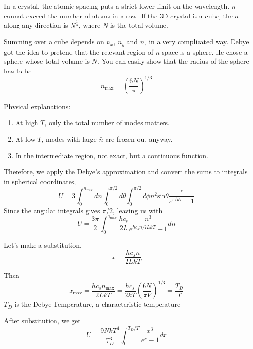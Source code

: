 In a crystal, the atomic spacing puts a strict lower limit on the wavelength. $n$ cannot exceed the number of atoms in a row. If the 3D crystal 
is a cube, the $n$ along any direction is $N^{\frac{1}{3}}$, where $N$ is the total volume.

Summing over a cube depends on $n_x$, $n_y$ and $n_z$ in a very complicated way. Debye got the idea to pretend that the relevant region of $n$-space is 
a sphere. He chose a sphere whose total volume is $N$. You can easily show that the radius of the sphere has to be
\begin{equation}
n_\textrm{max} = (\frac{6N}{\pi})^{1/3}
\end{equation}

Physical explanations:
\begin{enumerate}
\item At high $T$, only the total number of modes matters.
\item At low $T$, modes with large $\bar{n}$ are frozen out anyway.
\item In the intermediate region, not exact, but a continuous function.
\end{enumerate}

Therefore, we apply the Debye's approximation and convert the sums to integrals in spherical coordinates,
\begin{equation}
U = 3 \int_0^{n_\textrm{max}} dn \int_0^{\pi/2} d\theta \int_0^{\pi/2} d\phi n^2\textrm{sin}\theta \frac{\epsilon}{e^{\epsilon/kT}-1}
\end{equation}
Since the angular integrals gives $\pi/2$, leaving us with
\begin{equation}
U = \frac{3\pi}{2} \int_0 ^{n_\textrm{max}} \frac{hc_s}{2L} \frac{n^3}{e^{hc_sn/2LkT}-1} dn
\end{equation}

Let's make a substitution,
\begin{equation}
x = \frac{hc_sn}{2LkT}
\end{equation}

Then 
\begin{equation}
x_\textrm{max} = \frac{hc_s n_{\textrm{max}}}{2LkT} = \frac{hc_s}{2kT} (\frac{6N}{\pi V})^{1/3} = \frac{T_D}{T}
\end{equation}
$T_D$ is the Debye Temperature, a characteristic temperature. 

After substitution, we get
\begin{equation}
U = \frac{9NkT^4}{T_D^3} \int _0 ^{T_D/T} \frac{x^3}{e^x -1} dx
\end{equation}

